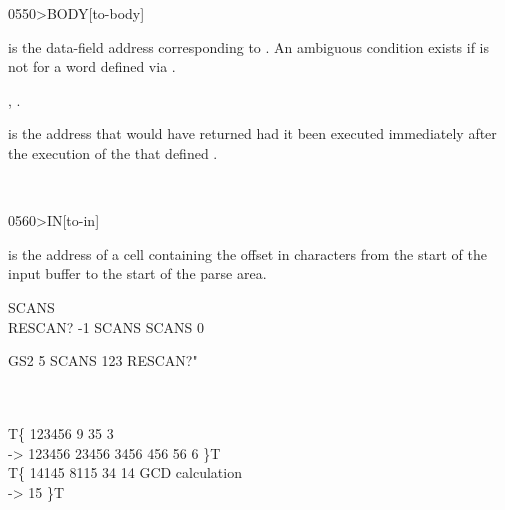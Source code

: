 \begin{worddef}[toBODY]{0550}{>BODY}[to-body]
\item {}

	 is the data-field address corresponding to
	. An ambiguous condition exists if  is not
	for a word defined via .

\see {},
	.

	\begin{rationale} %
		 is the address that  would have
		returned had it been executed immediately after the execution
		of the  that defined .
	\end{rationale}

	\begin{testing} %
		 \\
	\end{testing}
\end{worddef}


\begin{worddef}[toIN]{0560}{>IN}[to-in]
\item {}

	 is the address of a cell containing the offset in
	characters from the start of the input buffer to the start of
	the parse area.

	\begin{testing} %
		\ttfamily
		 SCANS \\
		\word{:} RESCAN?  -1 SCANS \word{+!} SCANS   0  \word{!}  \word{;}


		\word{:} GS2  5 SCANS \word{!}  123 RESCAN?"  \word{;} \\

		  \\
		 \\
		T\{ 123456   9  35  \word{+} 3 \word{+}  \word{!} \\
		-> 123456 23456 3456 456 56 6 \}T \\
		T\{ 14145 8115   34   \word{+!}   14  \word{!} GCD calculation \\
		-> 15 \}T
	\end{testing}
\end{worddef}


